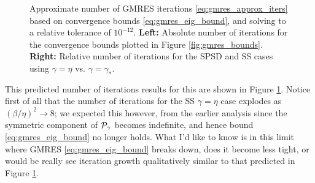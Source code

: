 \documentclass[a4paper,10pt]{article}
\begin{document}
{\begin{figure}[!htb]
\label{fig:gmres_iters}
\centering
{}
\caption{Approximate number of GMRES iterations \eqref{eq:gmres_approx_iters} based on convergence bounds \eqref{eq:gmres_eig_bound}, and solving to a relative tolerance of $10^{-12}$. \textbf{Left:} Absolute number of iterations for the convergence bounds plotted in Figure \ref{fig:gmres_bounds}. \textbf{Right:} Relative number of iterations for the SPSD and SS cases using $\gamma = \eta$ vs. $\gamma = \gamma_*$.}
\end{figure}

This predicted number of iterations results for this are shown in Figure \ref{fig:gmres_iters}. Notice first of all that the number of iterations for the SS $\gamma  = \eta$ case explodes as $(\beta/\eta)^2 \to 8$; we expected this however, from the earlier analysis since the symmetric component of ${\cal P}_{\gamma}$ becomes indefinite, and hence bound \eqref{eq:gmres_eig_bound} no longer holds. What I'd like to know is in this limit where GMRES \eqref{eq:gmres_eig_bound} breaks down, does it become less tight, or would be really see iteration growth qualitatively similar to that predicted in Figure \ref{fig:gmres_iters}.

}
\end{document}
